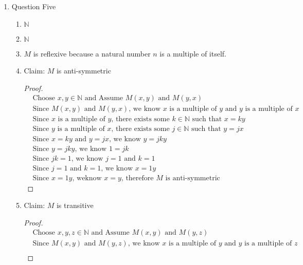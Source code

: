 \documentclass{article}
\begin{document}
\begin{enumerate}
\begin{enumerate}
\begin{enumerate}
        \end{enumerate}
    \end{enumerate}
    \item Question Five
    \begin{enumerate}
        \item $\mathbb{N}$ 
        \item $\mathbb{N}$
        \item $M$ is reflexive because a natural number $n$ is a multiple of itself.
        \item
        Claim: $M$ is anti-symmetric
        \begin{proof}
            \begin{align}
                &\text{Choose } x,y \in \mathbb{N} \text{ and Assume } M(x,y) \text{ and } M(y,x) \\
                &\text{Since } M(x,y) \text{ and } M(y,x) \text{, we know } x \text{ is a multiple of } y \text{ and } y \text{ is a multiple of } x \\
                &\text{Since } x \text{ is a multiple of } y \text{, there exists some } k \in \mathbb{N} \text{ such that } x = ky \\
                &\text{Since } y \text{ is a multiple of } x \text{, there exists some } j \in \mathbb{N} \text{ such that } y = jx \\
                &\text{Since } x = ky \text{ and } y = jx \text{, we know } y = jky \\
                &\text{Since } y = jky \text{, we know } 1 = jk \\
                &\text{Since } jk = 1 \text{, we know } j = 1 \text{ and } k = 1 \\
                &\text{Since } j = 1 \text{ and } k = 1 \text{, we know } x = 1y \\
                &\text{Since } x = 1y \text{, weknow } x = y \text{, therefore } M \text{ is anti-symmetric} 
            \end{align}
        \end{proof}
        \item
        Claim: $M$ is transitive
        \begin{proof}
            \begin{align}
                &\text{Choose } x,y,z \in \mathbb{N} \text{ and Assume } M(x, y) \text{ and } M(y, z) \\
                &\text{Since } M(x,y) \text{ and } M(y,z) \text{, we know } x \text{ is a multiple of } y \text{ and } y \text{ is a multiple of } z \\

\end{align}
\end{proof}
\end{enumerate}
\end{enumerate}
\end{document}
